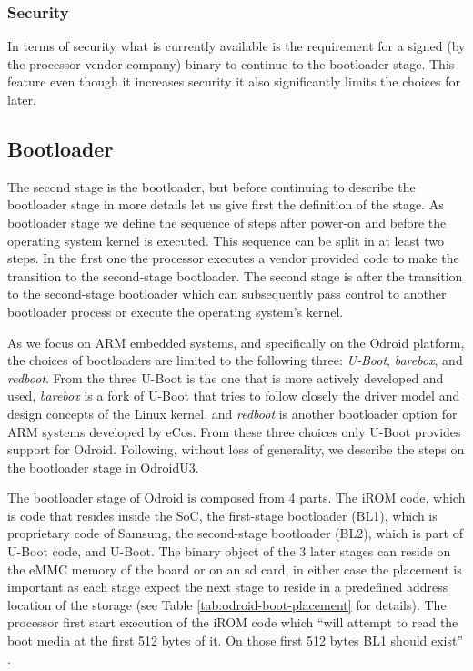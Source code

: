 \subsubsection{Security}

In terms of security what is currently available is the requirement for a signed (by the processor vendor company) binary to continue to the bootloader stage. This feature even though it increases security it also significantly limits the choices for later.

\subsection{Bootloader}

The second stage is the bootloader, but before continuing to describe the bootloader stage in more details let us give first the definition of the stage. As bootloader stage we define the sequence of steps after power-on and before the operating system kernel is executed. This sequence can be split in at least two steps. In the first one the processor executes a vendor provided code to make the transition to the second-stage bootloader. The second stage is after the transition to the second-stage bootloader which can subsequently pass control to another bootloader process or execute the operating system's kernel.

As we focus on ARM embedded systems, and specifically on the Odroid platform, the choices of bootloaders are limited to the following three: \textit{U-Boot}\cite{uboot}, \textit{barebox}\cite{barebox}, and \textit{redboot}\cite{redboot}. From the three U-Boot is the one that is more actively developed and used, \textit{barebox} is a fork of U-Boot that tries to follow closely the driver model and design concepts of the Linux kernel, and \textit{redboot} is another bootloader option for ARM systems developed by eCos. From these three choices only U-Boot provides support for Odroid. Following, without loss of generality, we describe the steps on the bootloader stage in OdroidU3.

The bootloader stage of Odroid is composed from 4 parts. The iROM code, which is code that resides inside the SoC, the first-stage bootloader (BL1), which is proprietary code of Samsung, the second-stage bootloader (BL2), which is part of U-Boot code, and  U-Boot. The binary object of the 3 later stages can reside on the eMMC memory of the board or on an sd card, in either case the placement is important as each stage expect the next stage to reside in a predefined address location of the storage (see Table \ref{tab:odroid-boot-placement} for details). The processor first start execution of the iROM code which ``will attempt to read the boot media at the first 512 bytes of it. On those first 512 bytes BL1 should exist'' \cite{odroid:boot_details}.

